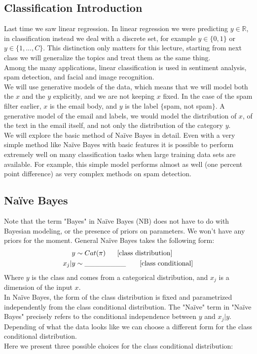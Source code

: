 \documentclass{article}
\begin{document}

\subsection{Classification Introduction}
    Last time we saw linear regression. In linear regression we were predicting $y \in \mathbb{R}$, in classification instead we deal with a discrete set, for example $y \in \{ 0,1\}$ or $y\in \{1,...,C\}$. This distinction only matters for this lecture, starting from next class we will generalize the topics and treat them as the same thing.\\
    Among the many applications, linear classification is used in sentiment analysis, spam detection, and facial and image recognition.\\
    We will use generative models of the data, which means that we will model both the $x$ and the $y$ explicitly, and we are not keeping $x$ fixed. In the case of the spam filter earlier, $x$ is the email body, and $y$ is the label $\{$spam, not spam$\}$. A generative model of the email and labels, we would model the distribution of $x$, of the text in the email itself, and not only the distribution of the category $y$.\\
    We will explore the basic method of Na\"ive Bayes in detail. Even with a very simple method like Na\"ive Bayes with basic features it is possible to perform extremely well on many classification tasks when large training data sets are available. For example, this simple model performs almost as well (one percent point difference) as very complex methods on spam detection.

\subsection{Na\"ive Bayes}
    Note that the term "Bayes" in Na\"ive Bayes (NB) does not have to do with Bayesian modeling, or the presence of priors on parameters. We won't have any priors for the moment.  General Na\"ive Bayes takes the following form:
    \begin{align}
        y &\sim Cat(\pi) ~~~~~ \text{[class distribution]}\\
        x_j|y &\sim \text{\textunderscore\textunderscore\textunderscore\textunderscore\textunderscore\textunderscore\textunderscore\textunderscore}      ~~~~~~    \text{[class conditional]}
    \end{align}
    Where $y$ is the class and comes from a categorical distribution, and $x_j$ is a dimension of the input $x$.\\
    In Na\"ive Bayes, the form of the class distribution is fixed and parametrized independently from the class conditional distribution. The "Na\"ive" term in "Na\"ive Bayes" precisely refers to the conditional independence between $y$ and $x_j|y$. Depending of what the data looks like we can choose a different form for the class conditional distribution. \\
    Here we present three possible choices for the class conditional distribution:
\end{document}
